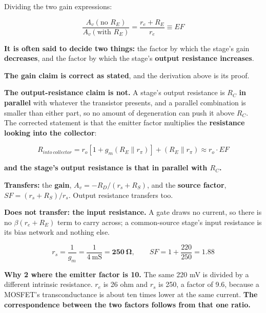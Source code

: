 
Dividing the two gain expressions:

\[
  \frac{A_v(\text{no } R_E)}{A_v(\text{with } R_E)} = \frac{r_e + R_E}{r_e} \equiv EF
\]

\textbf{It is often said to decide two things:} the factor by which the stage's gain \textbf{decreases}, and the factor by which the stage's \textbf{output resistance increases}.

\textbf{The gain claim is correct as stated}, and the derivation above is its proof.

\textbf{The output-resistance claim is not.} A stage's output resistance is $R_C$ \textbf{in parallel} with whatever the transistor presents, and a parallel combination is smaller than either part, so no amount of degeneration can push it above $R_C$. The corrected statement is that the emitter factor multiplies the \textbf{resistance looking into the collector}:

\[
  R_{into\ collector} = r_o\left[1 + g_m(R_E \parallel r_\pi)\right] + (R_E \parallel r_\pi)
  \approx r_o \cdot EF
\]

\textbf{and the stage's output resistance is that in parallel with $R_C$.}


\textbf{Transfers:} the \textbf{gain}, $A_v = -R_D/(r_s + R_S)$, and the \textbf{source factor}, $SF = (r_s + R_S)/r_s$. Output resistance transfers too.

\textbf{Does not transfer: the input resistance.} A gate draws no current, so there is no $\beta(r_e + R_E)$ term to carry across; a common-source stage's input resistance is its bias network and nothing else.

\[
  r_s = \frac{1}{g_m} = \frac{1}{4\ \text{mS}} = \mathbf{250\ \Omega}, \qquad
  SF = 1 + \frac{220}{250} = \mathbf{1.88}
\]

\textbf{Why 2 where the emitter factor is 10.} The same 220 mV is divided by a different intrinsic resistance. $r_e$ is 26 ohm and $r_s$ is 250, a factor of 9.6, because a MOSFET's transconductance is about ten times lower at the same current. \textbf{The correspondence between the two factors follows from that one ratio.}


